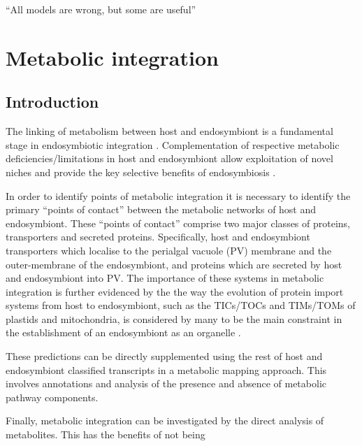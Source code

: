 \graphicspath{{chapters/5.Chapter_3/figures/}}

\begin{savequote}[75mm]
``All models are wrong, but some are useful''
\end{savequote}

\chapter{Metabolic integration}

\section{Introduction}

The linking of metabolism between host and endosymbiont is a fundamental 
stage in endosymbiotic integration \citep{Bhattacharya2007,Karkar2015a}.
Complementation of respective metabolic deficiencies/limitations in
host and endosymbiont allow exploitation of novel niches and provide
the key selective benefits of endosymbiosis \citep{Hoffmeister2003}.

In order to identify points of metabolic integration it is necessary to
identify the primary ``points of contact'' between the metabolic networks 
of host and endosymbiont. These ``points of contact'' comprise two
major classes of proteins, transporters and secreted proteins. 
Specifically, host and endosymbiont transporters which localise to the
perialgal vacuole (PV) membrane and the outer-membrane of the endosymbiont,
and proteins which are secreted by host and endosymbiont into 
PV.  
The importance of these systems in metabolic integration is further 
evidenced by the the way the evolution of protein import systems 
from host to endosymbiont, such as the TICs/TOCs and TIMs/TOMs
of plastids and mitochondria, is considered by many 
to be the main constraint in the establishment of an endosymbiont
as an organelle \citep{Pfanner2001.Keeling2008a}.


These predictions can be directly supplemented using the rest of
host and endosymbiont classified transcripts in a metabolic mapping 
approach.  This involves annotations and
analysis of the presence and absence of metabolic pathway components.


Finally, metabolic integration can be investigated by the 
direct analysis of metabolites.  This has the benefits of not being

